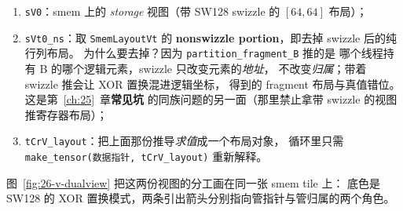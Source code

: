 \begin{enumerate}[itemsep=2pt,topsep=2pt]
  \item \texttt{sV0}：smem 上的 \emph{storage} 视图（带 SW128 swizzle 的
        $[64,64]$ 布局）；
  \item \texttt{sVt0\_ns}：取 \texttt{Smem\allowbreak{}Layout\allowbreak{}Vt} 的
        \textbf{nonswizzle portion}，即去掉 swizzle 后的纯行列布局。
        为什么要去掉？因为 \texttt{partition\_\allowbreak{}fragment\_\allowbreak{}B} 推的是
        哪个线程持有 B 的哪个逻辑元素，swizzle 只改变元素的\emph{地址}，
        不改变\emph{归属}；带着 swizzle 推会让 XOR 置换混进逻辑坐标，
        得到的 fragment 布局与真值错位。这是第~\ref{ch:25}~章\textbf{常见坑}
        的同族问题的另一面（那里禁止拿带 swizzle 的视图推寄存器布局）；
  \item \texttt{tCrV\_layout}：把上面那份推导\emph{求值}成一个布局对象，
        循环里只需 \texttt{make\_\allowbreak{}tensor\allowbreak{}(数据指针,\allowbreak{} t\allowbreak{}Cr\allowbreak{}V\_\allowbreak{}layout)} 重新解释。
\end{enumerate}

图~\ref{fig:26-v-dualview} 把这两份视图的分工画在同一张 smem tile 上：
底色是 SW128 的 XOR 置换模式，两条引出箭头分别指向管指针与管归属的两个角色。

